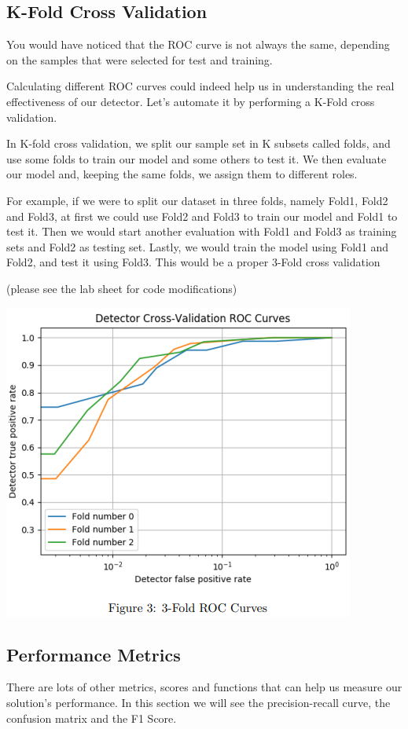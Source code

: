 \documentclass[]{project_plan}
\begin{document}
\subsection{K-Fold Cross Validation}

You would have
noticed that the ROC curve is not always the same, depending on the samples
that were selected for test and training.

Calculating different ROC curves could
indeed help us in understanding the real effectiveness of our detector. Let’s
automate it by performing a K-Fold cross validation.

In K-fold cross validation, we split our sample set in K subsets called folds,
and use some folds to train our model and some others to test it. We then
evaluate our model and, keeping the same folds, we assign them to different
roles.

For example, if we were to split our dataset in three folds, namely Fold1,
Fold2 and Fold3, at first we could use Fold2 and Fold3 to train our model and
Fold1 to test it. Then we would start another evaluation with Fold1 and Fold3
as training sets and Fold2 as testing set. Lastly, we would train the model using
Fold1 and Fold2, and test it using Fold3. This would be a proper 3-Fold cross
validation

(please see the lab sheet for code modifications)

\includegraphics[width=.6\linewidth]{kfold.png}

\subsection{Performance Metrics}

There are lots of other metrics, scores and functions that can help us measure
our solution’s performance. In this section we will see the precision-recall
curve, the confusion matrix and the F1 Score.
\end{document}
